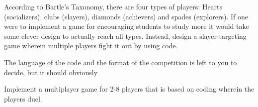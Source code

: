 \begin{refsection}
According to Bartle's Taxonomy\supercite{bartle}, there are four types of players: Hearts (socializers), clubs (slayers), diamonds (achievers) and spades (explorers). If one were to implement a game for encouraging students to study more it would take some clever design to actually reach all types. Instead, design a slayer-targeting game wherein multiple players fight it out by using code.

The language of the code and the format of the competition is left to you to decide, but it should obviously 

Implement a multiplayer game for 2-8 players that is based on coding wherein the players duel.
\printbibliography[heading=subbibliography]

\end{refsection}
